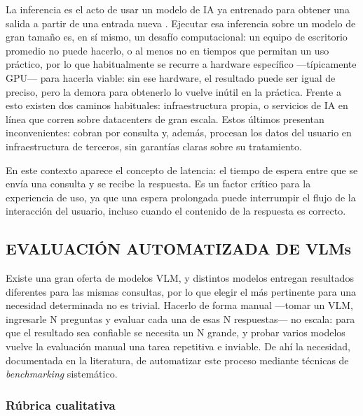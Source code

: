 La inferencia es el acto de usar un modelo de IA ya entrenado para obtener una salida a partir de una entrada nueva \cite{nvidiaaiinference}. Ejecutar esa inferencia sobre un modelo de gran tamaño es, en sí mismo, un desafío computacional: un equipo de escritorio promedio no puede hacerlo, o al menos no en tiempos que permitan un uso práctico, por lo que habitualmente se recurre a hardware específico —típicamente GPU— para hacerla viable: sin ese hardware, el resultado puede ser igual de preciso, pero la demora para obtenerlo lo vuelve inútil en la práctica. Frente a esto existen dos caminos habituales: infraestructura propia, o servicios de IA en línea que corren sobre datacenters de gran escala. Estos últimos presentan inconvenientes: cobran por consulta y, además, procesan los datos del usuario en infraestructura de terceros, sin garantías claras sobre su tratamiento.

En este contexto aparece el concepto de latencia: el tiempo de espera entre que se envía una consulta y se recibe la respuesta. Es un factor crítico para la experiencia de uso, ya que una espera prolongada puede interrumpir el flujo de la interacción del usuario, incluso cuando el contenido de la respuesta es correcto.

\subsection{EVALUACIÓN AUTOMATIZADA DE VLMs}

Existe una gran oferta de modelos VLM, y distintos modelos entregan resultados diferentes para las mismas consultas, por lo que elegir el más pertinente para una necesidad determinada no es trivial. Hacerlo de forma manual —tomar un VLM, ingresarle N preguntas y evaluar cada una de esas N respuestas— no escala: para que el resultado sea confiable se necesita un N grande, y probar varios modelos vuelve la evaluación manual una tarea repetitiva e inviable. De ahí la necesidad, documentada en la literatura, de automatizar este proceso mediante técnicas de \textit{benchmarking} sistemático.

\subsubsection{Rúbrica cualitativa}

